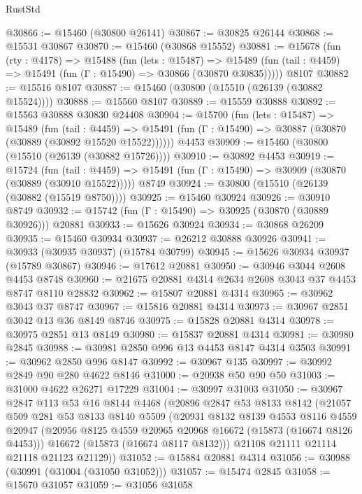 \begin{lexlean}{RustStd}
\begin{coremodule}
@30866 := @15460 (@30800 @26141)
@30867 := @30825 @26144
@30868 := @15531 @30867
@30870 := @15460 (@30868 @15552)
@30881 := @15678
    (fun (rty : @4178) =>
    @15488
      (fun (lets : @15487) =>
      @15489 (fun (tail : @4459) => @15491 (fun (Γ : @15490) => @30866 (@30870 @30835)))))
    @8107
@30882 := @15516 @8107
@30887 := @15460 (@30800 (@15510 (@26139 (@30882 @15524))))
@30888 := @15560 @8107
@30889 := @15559 @30888
@30892 := @15563 @30888 @30830 @24408
@30904 := @15700
    (fun (lets : @15487) =>
    @15489
      (fun (tail : @4459) =>
      @15491 (fun (Γ : @15490) => @30887 (@30870 (@30889 (@30892 @15520 @15522))))))
    @4453
@30909 := @15460 (@30800 (@15510 (@26139 (@30882 @15726))))
@30910 := @30892 @4453
@30919 := @15724
    (fun (tail : @4459) => @15491 (fun (Γ : @15490) => @30909 (@30870 (@30889 (@30910 @15522)))))
    @8749
@30924 := @30800 (@15510 (@26139 (@30882 (@15519 @8750))))
@30925 := @15460 @30924
@30926 := @30910 @8749
@30932 := @15742 (fun (Γ : @15490) => @30925 (@30870 (@30889 @30926))) @20881
@30933 := @15626 @30924
@30934 := @30868 @26209
@30935 := @15460 @30934
@30937 := @26212 @30888 @30926
@30941 := @30933 (@30935 @30937) (@15784 @30799)
@30945 := @15626 @30934 @30937 (@15789 @30867)
@30946 := @17612 @20881
@30950 := @30946 @3044 @2608 @4453 @8748
@30960 := @21675 @20881 @4314 @2634 @2608 @3043 @37 @4453 @8747 @8110 @28832
@30962 := @15807 @20881 @4314
@30965 := @30962 @3043 @37 @8747
@30967 := @15816 @20881 @4314
@30973 := @30967 @2851 @3042 @13 @36 @8149 @8746
@30975 := @15828 @20881 @4314
@30978 := @30975 @2851 @13 @8149
@30980 := @15837 @20881 @4314
@30981 := @30980 @2845
@30988 := @30981 @2850 @996 @13 @4453 @8147 @4314 @3503
@30991 := @30962 @2850 @996 @8147
@30992 := @30967 @135
@30997 := @30992 @2849 @90 @280 @4622 @8146
@31000 := @20938 @50 @90 @50
@31003 := @31000 @4622 @26271 @17229
@31004 := @30997 @31003
@31050 := @30967
    @2847
    @113
    @53
    @16
    @8144
    @4468
    (@20896
      @2847
      @53
      @8133
      @8142
      (@21057
        @509
        @281
        @53
        @8133
        @8140
        @5509
        (@20931
          @8132
          @8139
          @4553
          @8116
          @4559
          @20947
          (@20956 @8125 @4559 @20965 @20968 @16672 (@15873 (@16674 @8126 @4453)))
          @16672
          (@15873 (@16674 @8117 @8132)))
        @21108
        @21111
        @21114
        @21118
        @21123
        @21129))
@31052 := @15884 @20881 @4314
@31056 := @30988 (@30991 (@31004 (@31050 @31052)))
@31057 := @15474 @2845
@31058 := @15670 @31057
@31059 := @31056 @31058

\end{coremodule}
\end{lexlean}
